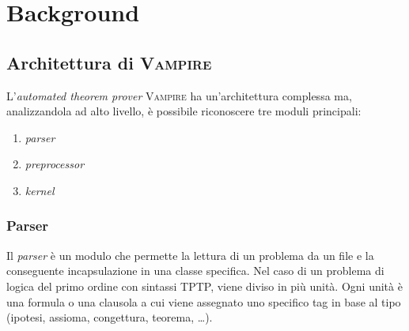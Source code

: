 \chapter{Background}\label{first-c}
\section{Architettura di \textsc{Vampire}}
L'\emph{automated theorem prover} \textsc{Vampire} ha un'architettura complessa ma, analizzandola ad alto livello, è possibile riconoscere tre moduli 
principali:
\begin{enumerate}
    \item \emph{parser}
    \item \emph{preprocessor}
    \item \emph{kernel}
\end{enumerate}
\begin{figure}[H]
\end{figure}


\subsection{Parser}
Il \emph{parser} è un modulo che permette la lettura di un problema da un file e la conseguente incapsulazione in una classe specifica.
Nel caso di un problema di logica del primo ordine con sintassi TPTP, viene diviso in più unità.
Ogni unità è una formula o una clausola a cui viene assegnato uno specifico tag in base al tipo (ipotesi, assioma, congettura, teorema, \dots).

